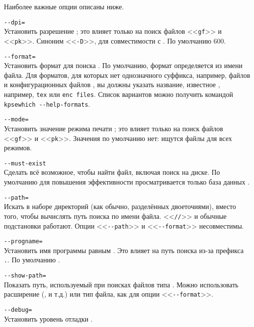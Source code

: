 \documentclass{article}
\renewcommand{\samp}[1]{<<\texttt{#1}>>}
\begin{document}
Наиболее важные опции описаны ниже.

\begin{ttdescription}
\item[\texttt{-{}-dpi=\var{num}}]\mbox{}\\
  Установить разрешение ; это влияет только на поиск файлов
  \samp{gf} и \samp{pk}.  Синоним \samp{-D}, для
  совместимости с .  По умолчанию 600.

\item[\texttt{-{}-format=\var{name}}]\mbox{}\\
  Установить формат для поиска .  По умолчанию, формат
  определяется из имени файла.  Для форматов, для которых нет
  однозначного суффикса, например, файлов \MP{} и конфигурационных
  файлов , вы должны указать название, известное
  \KPS{}, например, \texttt{tex} или \texttt{enc files}.  Список
  вариантов можно получить командой \texttt{kpsewhich -{}-help-formats}.

\item[\texttt{-{}-mode=\var{string}}]\mbox{}\\
  Установить значение режима печати ; это влияет только
  на поиск файлов \samp{gf} и \samp{pk}.  Значения по умолчанию нет:
  ищутся файлы для всех режимов.

\item[\texttt{-{}-must-exist}]\mbox{}\\
  Сделать всё возможное, чтобы найти файл, включая поиск на диске.  По
  умолчанию для повышения эффективности просматривается только база
  данных .

\item[\texttt{-{}-path=\var{string}}]\mbox{}\\
  Искать в наборе директорий  (как обычно, разделённых
  двоеточиями), вместо того, чтобы вычислять путь поиска по имени
  файла.  \samp{//} и обычные подстановки работают.  Опции
  \samp{-{}-path} и \samp{-{}-format} несовместимы.

\item[\texttt{-{}-progname=\var{name}}]\mbox{}\\
  Установить имя программы равным \texttt{}.  Это влияет на
  путь поиска из-за префикса \texttt{.}.  По умолчанию
  .

\item[\texttt{-{}-show-path=\var{name}}]\mbox{}\\
  Показать путь, используемый при поисках файлов типа
  \texttt{}.  Можно использовать расширение (,
   и т.д.) или тип файла, как для опции \samp{-{}-format}.

\item[\texttt{-{}-debug=\var{num}}]\mbox{}\\
  Установить уровень отладки \texttt{}.
\end{ttdescription}
\end{document}
